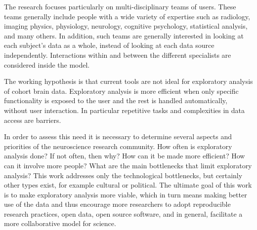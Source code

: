The research focuses particularly on multi-disciplinary teams of users. These teams generally include people with a wide variety of expertise such as radiology, imaging physics, physiology, neurology, cognitive psychology, statistical analysis, and many others. In addition, such teams are generally interested in looking at each subject's data as a whole, instead of looking at each data source independently. Interactions within and between the different specialists are considered inside the model.

The working hypothesis is that  current tools are not ideal for exploratory analysis of cohort brain data. Exploratory analysis is more efficient when only specific functionality is exposed to the user and the rest is handled automatically, without user interaction. In particular repetitive tasks and complexities in data access are barriers.

In order to assess this need it is necessary to determine several aspects and priorities of the neuroscience research community. How often is exploratory analysis done? If not often, then why? How can it be made more efficient? How can it involve more people? What are the main bottlenecks that limit exploratory analysis? This work addresses only the technological bottlenecks, but certainly other types exist, for example cultural or political. The ultimate goal of this work is to make exploratory analysis more viable, which in turn means making better use of the data and thus encourage more researchers to adopt reproducible research practices, open data, open source software, and in general, facilitate a more collaborative model for science.



